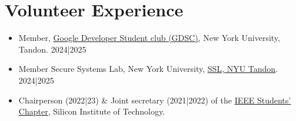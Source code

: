 \documentclass[letterpaper,10pt]{article}
\newcommand{\resumeItem}[1]{
  \item\small{
    {#1 \vspace{-2pt}}
  }
}
\newcommand{\resumeSubItem}[1]{\resumeItem{#1}\vspace{-4pt}}
\newcommand{\resumeSubHeadingListStart}{\begin{itemize}[leftmargin=0.15in, label={}]}
\newcommand{\resumeSubHeadingListEnd}{\end{itemize}}
\begin{document}
%

\section{Volunteer Experience}
  \resumeSubHeadingListStart
  \resumeSubItem
      {Member, \href{https://www.linkedin.com/company/gdsc-nyu-tandon/}{\underline{Google Developer Student club (GDSC)}}, New York University, Tandon.  2024|2025}
    \resumeSubItem
      {Member Secure Systems Lab, New York University, \href{https://ssl.engineering.nyu.edu/}{\underline{SSL, NYU Tandon}}. 2024|2025}
    \resumeSubItem
      {Chairperson (2022|23) \& Joint secretary (2021|2022) of the \href{https://www.instagram.com/ieeesitbbsr/}{\underline{IEEE Students' Chapter}}, Silicon Institute of Technology. }
  \resumeSubHeadingListEnd
\end{document}
